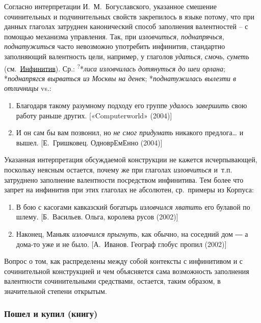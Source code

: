 Согласно интерпретации И.~М.~Богуславского, указанное смешение
сочинительных и подчинительных свойств закрепилось в языке потому, что
при данных глаголах затруднен канонический способ заполнения
валентностей -- с помощью механизма управления. Так, при
\emph{изловчиться}, \emph{поднапрячься}, \emph{поднатужиться} часто
невозможно употребить инфинитив, стандартно заполняющий валентность
цели, например, у глаголов \emph{удаться}, \emph{смочь}, \emph{суметь}
(см.~\underline{Инфинитив}). Ср.: \textsuperscript{?}*\emph{лиса
изловчилась дотянуться до шеи орлана}; *\emph{поднапрягся вырваться из
Москвы на денек}; *\emph{поднатужилась вылезти в отличницы} vs.:

\begin{enumerate}
\def\labelenumi{(\arabic{enumi})}
\setcounter{enumi}{51}
\item
  Благодаря такому разумному подходу его группе \emph{удалось завершить}
  свою работу раньше других. {[}«Computerworld» (2004){]}
\item
  И он сам бы вам позвонил, но \emph{не смог придумать} никакого
  предлога\ldots{} и вышел. {[}Е.~Гришковец. ОдноврЕмЕнно (2004){]}
\end{enumerate}

Указанная интерпретация обсуждаемой конструкции не кажется
исчерпывающей, поскольку неясным остается, почему же при глаголах
\emph{изловчиться} и~т.п. затруднено заполнение валентности посредством
инфинитива. Тем более что запрет на инфинитив при этих глаголах не
абсолютен, ср.~примеры из Корпуса:

\begin{enumerate}
\def\labelenumi{(\arabic{enumi})}
\setcounter{enumi}{53}
\item
  В бою с касогами кавказский богатырь \emph{изловчился хватить} его
  булавой по шлему. {[}Б.~Васильев. Ольга, королева русов (2002){]}
\item
  Наконец, Маньяк \emph{изловчился прыгнуть}, как обычно, на соседний
  дом ― а дома-то уже и не было. {[}А.~Иванов. Географ глобус пропил
  (2002){]}
\end{enumerate}

Вопрос о том, как распределены между собой контексты с инфинитивом и с
сочинительной конструкцией и чем объясняется сама возможность заполнения
валентности сочинительными средствами, остается, таким образом, в
значительной степени открытым.

\hypertarget{ux43fux43eux448ux435ux43b-ux438-ux43aux443ux43fux438ux43b-ux43aux43dux438ux433ux443}{%
\subsubsection{Пошел и купил
(книгу)}\label{ux43fux43eux448ux435ux43b-ux438-ux43aux443ux43fux438ux43b-ux43aux43dux438ux433ux443}}

